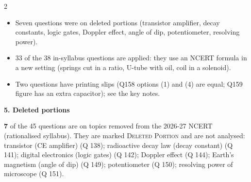 \begin{multicols}{2}
{\begin{itemize}[leftmargin=1em,nosep]
\item Seven questions were on deleted portions (transistor amplifier, decay constants, logic gates, Doppler effect, angle of dip, potentiometer, resolving power).
\item 33 of the 38 in-syllabus questions are applied: they use an NCERT formula in a new setting (springs cut in a ratio, U-tube with oil, coil in a solenoid).
\item Two questions have printing slips (Q158 options (1) and (4) are equal; Q159 figure has an extra capacitor); see the key notes.
\end{itemize}}\par\medskip
\textbf{\color{crimson}5. Deleted portions}\par\smallskip
\textbf{7} of the 45 questions are on topics removed from the 2026-27 NCERT (rationalised syllabus). They are marked \textsc{Deleted Portion} and are not analysed: transistor (CE amplifier) (Q 138); radioactive decay law (decay constant) (Q 141); digital electronics (logic gates) (Q 142); Doppler effect (Q 144); Earth's magnetism (angle of dip) (Q 149); potentiometer (Q 150); resolving power of microscope (Q 151).\par
\end{multicols}


